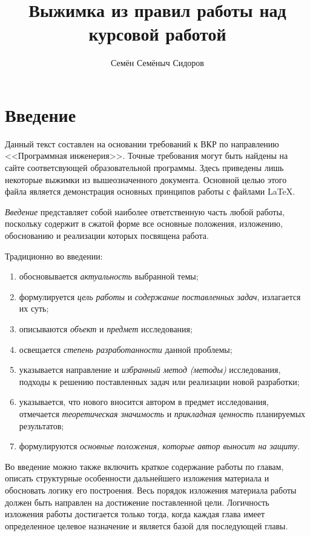 \documentclass[PI,VKR]{HSEUniversityPractice}
\title{Выжимка из правил работы над курсовой работой}
\author{Семён Семёныч Сидоров}
\begin{document}
\maketitle

\chapter*{Введение}

Данный текст составлен на основании требований к ВКР по направлению <<Программная инженерия>>. Точные требования могут быть найдены на сайте соответсвующей образовательной программы. Здесь приведены лишь некоторые выжимки из вышеозначенного документа. Основной целью этого файла является демонстрация основных принципов работы с файлами \LaTeX{}.

\emph{Введение} представляет собой наиболее ответственную часть любой работы, поскольку содержит в сжатой форме все основные положения, изложению, обоснованию и реализации которых посвящена работа.

Традиционно во введении:
\begin{enumerate}
	\item  обосновывается \emph{актуальность} выбранной темы;
	\item  формулируется \emph{цель работы} и \emph{содержание поставленных задач}, излагается их суть;
	\item  описываются \emph{объект} и \emph{предмет} исследования;
	\item  освещается \emph{степень разработанности} данной проблемы;
	\item  указывается направление и \emph{избранный метод (методы)} исследования, подходы к решению поставленных задач или реализации новой разработки;
	\item  указывается, что нового вносится автором в предмет исследования, отмечается \emph{теоретическая значимость} и \emph{прикладная ценность} планируемых результатов;
	\item  формулируются \emph{основные положения, которые автор выносит на защиту}.
\end{enumerate}

Во введение можно также включить краткое содержание работы по главам, описать структурные особенности дальнейшего изложения материала и обосновать логику его построения. Весь порядок изложения материала работы должен быть направлен на достижение поставленной цели. Логичность изложения работы достигается только тогда, когда каждая глава имеет определенное целевое назначение и является базой для последующей главы.
\end{document}
